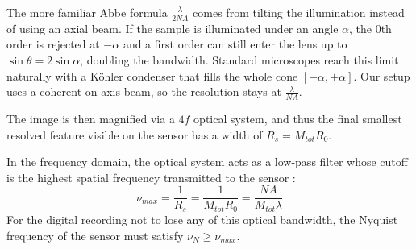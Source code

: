 

The more familiar Abbe formula $\tfrac{\lambda}{2NA}$ comes from tilting the illumination instead of using an axial beam. If the sample is illuminated under an angle $\alpha$, the 0th order is rejected at $-\alpha$ and a first order can still enter the lens up to $\sin\theta = 2\sin\alpha$, doubling the bandwidth. Standard microscopes reach this limit naturally with a Köhler condenser that fills the whole cone $[-\alpha,+\alpha]$. Our setup uses a coherent on-axis beam, so the resolution stays at $\tfrac{\lambda}{NA}$.


The image is then magnified via a $4f$ optical system, and thus the final smallest resolved feature visible on the sensor has a width of $R_s=M_{tot}R_0$.

In the frequency domain, the optical system acts as a low-pass filter whose cutoff is the highest spatial frequency transmitted to the sensor : $$\nu_{max} = \frac{1}{R_s}= \frac{1}{M_{tot}R_0}= \frac{NA}{M_{tot}\lambda}$$
For the digital recording not to lose any of this optical bandwidth, the Nyquist frequency of the sensor must satisfy $\nu_N\geq\nu_{max}$.

